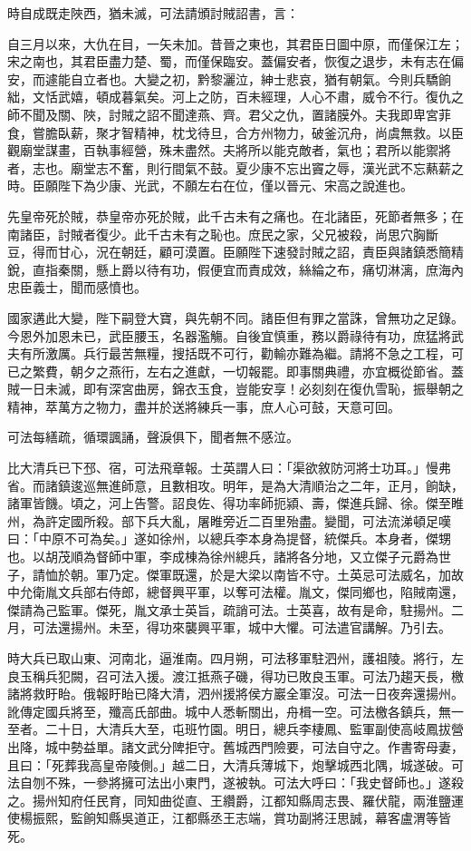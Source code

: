 \begin{pinyinscope}
時自成既走陜西，猶未滅，可法請頒討賊詔書，言：

自三月以來，大仇在目，一矢未加。昔晉之東也，其君臣日圖中原，而僅保江左；宋之南也，其君臣盡力楚、蜀，而僅保臨安。蓋偏安者，恢復之退步，未有志在偏安，而遽能自立者也。大變之初，黔黎灑泣，紳士悲哀，猶有朝氣。今則兵驕餉絀，文恬武嬉，頓成暮氣矣。河上之防，百未經理，人心不肅，威令不行。復仇之師不聞及關、陜，討賊之詔不聞達燕、齊。君父之仇，置諸膜外。夫我即卑宮菲食，嘗膽臥薪，聚才智精神，枕戈待旦，合方州物力，破釜沉舟，尚虞無救。以臣觀廟堂謀畫，百執事經營，殊未盡然。夫將所以能克敵者，氣也；君所以能禦將者，志也。廟堂志不奮，則行間氣不鼓。夏少康不忘出竇之辱，漢光武不忘爇薪之時。臣願陛下為少康、光武，不願左右在位，僅以晉元、宋高之說進也。

先皇帝死於賊，恭皇帝亦死於賊，此千古未有之痛也。在北諸臣，死節者無多；在南諸臣，討賊者復少。此千古未有之恥也。庶民之家，父兄被殺，尚思穴胸斷豆，得而甘心，況在朝廷，顧可漠置。臣願陛下速發討賊之詔，責臣與諸鎮悉簡精銳，直指秦關，懸上爵以待有功，假便宜而責成效，絲綸之布，痛切淋漓，庶海內忠臣義士，聞而感憤也。

國家遘此大變，陛下嗣登大寶，與先朝不同。諸臣但有罪之當誅，曾無功之足錄。今恩外加恩未已，武臣腰玉，名器濫觴。自後宜慎重，務以爵祿待有功，庶猛將武夫有所激厲。兵行最苦無糧，搜括既不可行，勸輸亦難為繼。請將不急之工程，可已之繁費，朝夕之燕衎，左右之進獻，一切報罷。即事關典禮，亦宜概從節省。蓋賊一日未滅，即有深宮曲房，錦衣玉食，豈能安享！必刻刻在復仇雪恥，振舉朝之精神，萃萬方之物力，盡并於送將練兵一事，庶人心可鼓，天意可回。

可法每繕疏，循環諷誦，聲淚俱下，聞者無不感泣。

比大清兵已下邳、宿，可法飛章報。士英謂人曰：「渠欲敘防河將士功耳。」慢弗省。而諸鎮逡巡無進師意，且數相攻。明年，是為大清順治之二年，正月，餉缺，諸軍皆饑。頃之，河上告警。詔良佐、得功率師扼潁、壽，傑進兵歸、徐。傑至睢州，為許定國所殺。部下兵大亂，屠睢旁近二百里殆盡。變聞，可法流涕頓足嘆曰：「中原不可為矣。」遂如徐州，以總兵李本身為提督，統傑兵。本身者，傑甥也。以胡茂順為督師中軍，李成棟為徐州總兵，諸將各分地，又立傑子元爵為世子，請恤於朝。軍乃定。傑軍既還，於是大梁以南皆不守。土英忌可法威名，加故中允衛胤文兵部右侍郎，總督興平軍，以奪可法權。胤文，傑同鄉也，陷賊南還，傑請為己監軍。傑死，胤文承士英旨，疏誚可法。士英喜，故有是命，駐揚州。二月，可法還揚州。未至，得功來襲興平軍，城中大懼。可法遣官講解。乃引去。

時大兵已取山東、河南北，逼淮南。四月朔，可法移軍駐泗州，護祖陵。將行，左良玉稱兵犯闕，召可法入援。渡江抵燕子磯，得功已敗良玉軍。可法乃趨天長，檄諸將救盱眙。俄報盱眙已降大清，泗州援將侯方巖全軍沒。可法一日夜奔還揚州。訛傳定國兵將至，殲高氏部曲。城中人悉斬關出，舟楫一空。可法檄各鎮兵，無一至者。二十日，大清兵大至，屯班竹園。明日，總兵李棲鳳、監軍副使高岐鳳拔營出降，城中勢益單。諸文武分陴拒守。舊城西門險要，可法自守之。作書寄母妻，且曰：「死葬我高皇帝陵側。」越二日，大清兵薄城下，炮擊城西北隅，城遂破。可法自刎不殊，一參將擁可法出小東門，遂被執。可法大呼曰：「我史督師也。」遂殺之。揚州知府任民育，同知曲從直、王纘爵，江都知縣周志畏、羅伏龍，兩淮鹽運使楊振熙，監餉知縣吳道正，江都縣丞王志端，賞功副將汪思誠，幕客盧渭等皆死。


\end{pinyinscope}
